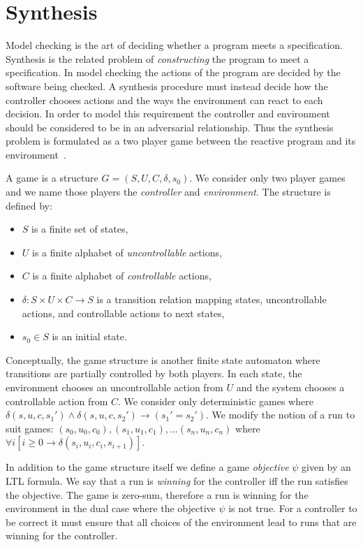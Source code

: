 \section{Synthesis}

Model checking is the art of deciding whether a program meets a specification. Synthesis is the related problem of \emph{constructing} the program to meet a specification. In model checking the actions of the program are decided by the software being checked. A synthesis procedure must instead decide how the controller chooses actions and the ways the environment can react to each decision. In order to model this requirement the controller and environment should be considered to be in an adversarial relationship. Thus the synthesis problem is formulated as a two player game between the reactive program and its environment~\cite{Pnueli89}.

A game is a structure $G = (S, U, C, \delta, s_0)$. We consider only two player games and we name those players the \emph{controller} and \emph{environment}. The structure is defined by:

\begin{itemize}
    \item $S$ is a finite set of states,
    \item $U$ is a finite alphabet of \emph{uncontrollable} actions,
    \item $C$ is a finite alphabet of \emph{controllable} actions,
    \item $\delta : S \times U \times C \to S$ is a transition relation mapping states, uncontrollable actions, and controllable actions to next states,
    \item $s_0 \in S$ is an initial state.
\end{itemize}

Conceptually, the game structure is another finite state automaton where transitions are partially controlled by both players. In each state, the environment chooses an uncontrollable action from $U$ and the system chooses a controllable action from $C$. We consider only deterministic games where $\delta(s, u, c, s_1') \land \delta(s, u, c, s_2') \to (s_1' = s_2')$.  We modify the notion of a run to suit games: $(s_0, u_0, c_0), (s_1, u_1, c_1), ... (s_n, u_n, c_n)$ where $\forall i [i \geq 0 \to \delta(s_i, u_i, c_i, s_{i+1})]$. 

In addition to the game structure itself we define a game \emph{objective} $\psi$ given by an LTL formula. We say that a run is \emph{winning} for the controller iff the run satisfies the objective. The game is zero-sum, therefore a run is winning for the environment in the dual case where the objective $\psi$ is not true. For a controller to be correct it must ensure that all choices of the environment lead to runs that are winning for the controller. 

